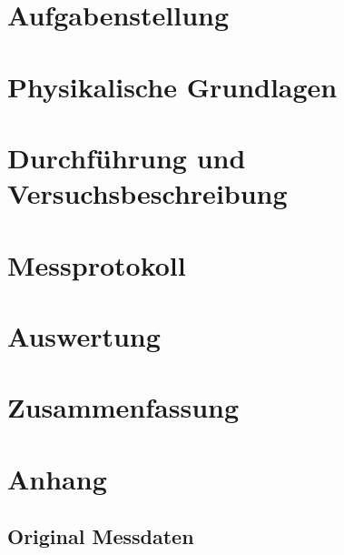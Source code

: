 \documentclass{article}
\title{}
\author{Joaquin Gottlebe \\\\ Tutor: }
\date{\today}
\begin{document}
\maketitle
\tableofcontents
\newpage
\listoffigures
\newpage
\section{Aufgabenstellung} 
\section{Physikalische Grundlagen}
\section{Durchführung und Versuchsbeschreibung}
\section{Messprotokoll}
\section{Auswertung}
\section{Zusammenfassung}
\newpage
\appendix
\section{Anhang}
\subsection{Original Messdaten}
\end{document}
